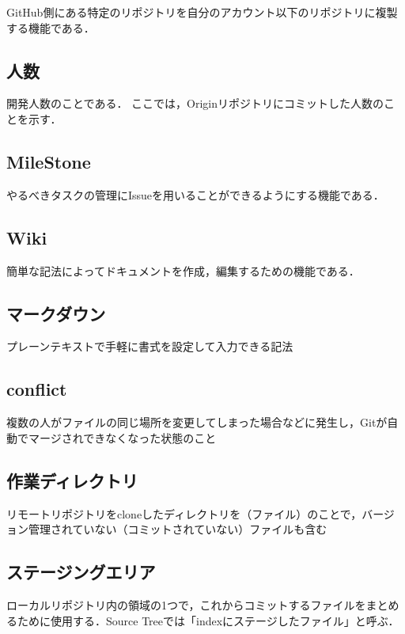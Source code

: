 GitHub側にある特定のリポジトリを自分のアカウント以下のリポジトリに複製する機能である．

\subsection{人数}

開発人数のことである．
ここでは，Originリポジトリにコミットした人数のことを示す．

\subsection{MileStone}

やるべきタスクの管理にIssueを用いることができるようにする機能である．

\subsection{Wiki}

簡単な記法によってドキュメントを作成，編集するための機能である．

\subsection{マークダウン}

プレーンテキストで手軽に書式を設定して入力できる記法

\subsection{conflict}

複数の人がファイルの同じ場所を変更してしまった場合などに発生し，Gitが自動でマージされできなくなった状態のこと

\subsection{作業ディレクトリ}

リモートリポジトリをcloneしたディレクトリを（ファイル）のことで，バージョン管理されていない（コミットされていない）ファイルも含む

\subsection{ステージングエリア}

ローカルリポジトリ内の領域の1つで，これからコミットするファイルをまとめるために使用する．Source Treeでは「indexにステージしたファイル」と呼ぶ．

